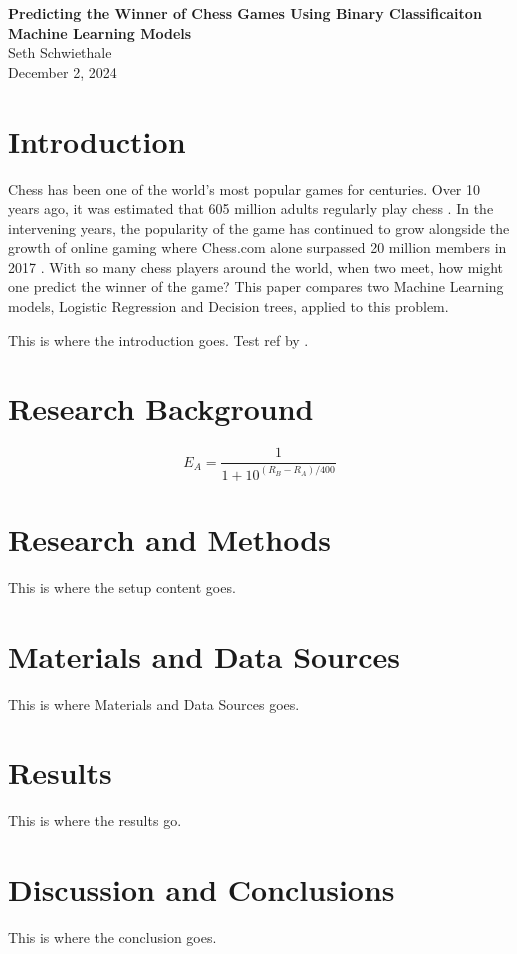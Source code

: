 \documentclass[12pt]{article}
\begin{document}
\begin{titlepage}
    \centering
    \vspace*{2in}
    {\Huge \bfseries Predicting the Winner of Chess Games Using Binary Classificaiton Machine Learning Models \\[2in]}
    {\Large Seth Schwiethale \\[0.5in]}
    {\Large December 2, 2024 \\}
    \vfill
\end{titlepage}

\newpage
\tableofcontents
\newpage

\section{Introduction}
Chess has been one of the world's most popular games for centuries. Over 10 years ago, it was estimated that 605 million adults regularly play chess \cite{fidePressRelease2012}. In the intervening years, the popularity of the game has continued to grow alongside the growth of online gaming where Chess.com alone surpassed 20 million members in 2017 \cite{chessMembers}. With so many chess players around the world, when two meet, how might one predict the winner of the game? This paper compares two Machine Learning models, Logistic Regression and Decision trees, applied to this problem.

This is where the introduction goes. Test ref by \cite{100MLB}.

\section{Research Background}


\[
E_A = \frac{1}{1 + 10^{(R_B - R_A)/400}}
\]

\section{Research and Methods}
This is where the setup content goes.

\section{Materials and Data Sources}
This is where Materials and Data Sources goes.

\section{Results}
This is where the results go.

\section{Discussion and Conclusions}
This is where the conclusion goes.

\newpage

\end{document}
